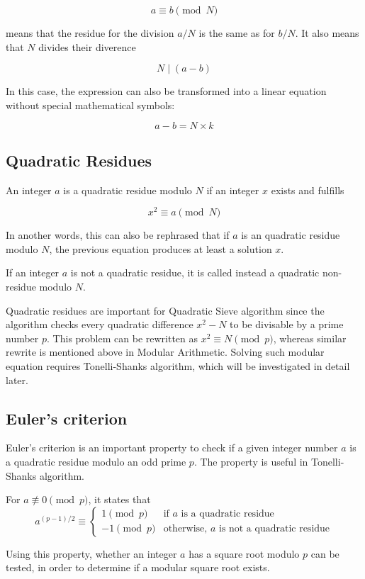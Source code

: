 \documentclass[11pt,a4paper]{article}
\begin{document}
\[
a \equiv b \pmod{N}
\]

means that the residue for the division $a/N$ is the same as for $b/N$. It also means that $N$ divides their diverence

\[
N \mid (a-b)
\]

In this case, the expression can also be transformed into a linear equation without special mathematical symbols:

\[
a - b = N \times k
\]

\subsection*{Quadratic Residues}

An integer $a$ is a quadratic residue modulo $N$ if an integer $x$ exists and fulfills

\[
x^2 \equiv a \pmod{N}
\]

In another words, this can also be rephrased that if $a$ is an quadratic residue modulo $N$, the previous equation produces at least a solution $x$.

If an integer $a$ is not a quadratic residue, it is called instead a quadratic non-residue modulo $N$.

Quadratic residues are important for Quadratic Sieve algorithm since  the algorithm checks every quadratic difference $x^2 - N$ to be divisable by a prime number $p$. This problem can be rewritten as $x^2 \equiv N \pmod{p}$, whereas similar rewrite is mentioned above in Modular Arithmetic. Solving such modular equation requires Tonelli-Shanks algorithm, which will be investigated in detail later.

\subsection*{Euler's criterion}

Euler's criterion is an important property to check if a given integer number $a$ is a quadratic residue modulo an odd prime $p$. The property is useful in Tonelli-Shanks algorithm. 

For $a \not\equiv 0 \pmod p$, it states that
\[
a^{(p-1)/2} \equiv
\begin{cases}
1 \pmod p & \text{if } a \text{ is a quadratic residue}\\
-1 \pmod p & \text{otherwise, } a \text{ is not a quadratic residue}
\end{cases}
\]

Using this property, whether an integer $a$ has a square root modulo $p$ can be tested, in order to determine if a modular square root exists.
\end{document}

